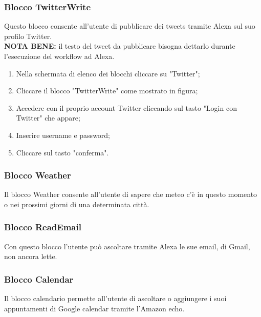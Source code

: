 \subsubsection{Blocco TwitterWrite} \label{twitterW}
Questo blocco consente all'utente di pubblicare dei tweets tramite Alexa sul suo profilo Twitter. \\
\textbf{NOTA BENE:} il testo del tweet da pubblicare bisogna dettarlo durante 	l'esecuzione del workflow ad Alexa.
\begin{enumerate}
	\item Nella schermata di elenco dei blocchi cliccare su "Twitter";
	\item Cliccare il blocco "TwitterWrite" come mostrato in figura;
	\item Accedere con il proprio account Twitter cliccando sul tasto
		"Login con Twitter" che appare;
	\item Inserire username e password;
	\item Cliccare sul tasto "conferma".
\end{enumerate}

\subsubsection{Blocco Weather}
Il blocco Weather consente all'utente di sapere che meteo c'è in questo momento o nei prossimi giorni di una determinata città.

\subsubsection{Blocco ReadEmail}
Con questo blocco l'utente può ascoltare tramite Alexa le sue email, di Gmail, non ancora lette.

\subsubsection{Blocco Calendar}
Il blocco calendario permette all'utente di ascoltare o aggiungere i suoi appuntamenti di Google calendar tramite l'Amazon echo.
\newpage

